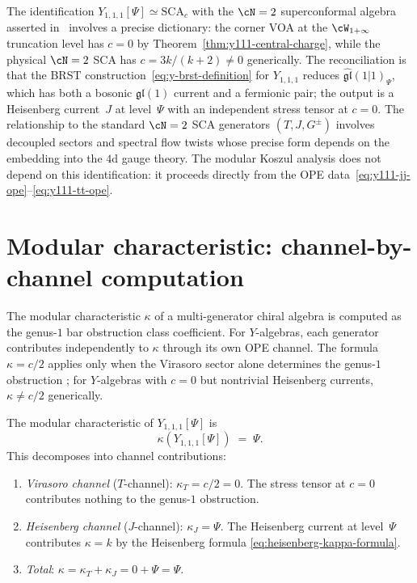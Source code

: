 \begin{remark}[Relationship to the $\cN = 2$ superconformal
algebra]%
\label{rem:y111-n2-relationship}
The identification $Y_{1,1,1}[\Psi] \simeq \mathrm{SCA}_{c}$
with the $\cN = 2$ superconformal algebra
asserted in~\cite{gaiotto-rapchak} involves a precise dictionary:
the corner VOA at the $\cW_{1+\infty}$ truncation level has
$c = 0$ by Theorem~\ref{thm:y111-central-charge}, while the
physical $\cN = 2$ SCA has $c = 3k/(k{+}2) \neq 0$ generically.
The reconciliation is that the BRST
construction~\eqref{eq:y-brst-definition} for $Y_{1,1,1}$
reduces $\widehat{\mathfrak{gl}}(1|1)_\Psi$, which has both
a bosonic $\mathfrak{gl}(1)$ current and a fermionic pair;
the output is a Heisenberg current~$J$ at level~$\Psi$ with
an independent stress tensor at $c = 0$. The relationship
to the standard $\cN = 2$ SCA generators $(T, J, G^\pm)$
involves decoupled sectors and spectral flow twists whose
precise form depends on the embedding into the $4$d gauge theory.
The modular Koszul analysis does not depend on this
identification: it proceeds directly from the OPE
data~\eqref{eq:y111-jj-ope}--\eqref{eq:y111-tt-ope}.
\end{remark}


\section{Modular characteristic: channel-by-channel computation}%
\label{sec:y-kappa}

The modular characteristic $\kappa$ of a multi-generator
chiral algebra is computed as the genus-$1$ bar obstruction
class coefficient. For $Y$-algebras, each generator
contributes independently to $\kappa$ through its own OPE
channel. The formula $\kappa = c/2$ applies only when the
Virasoro sector alone determines the genus-$1$ obstruction
; for $Y$-algebras with $c = 0$ but nontrivial
Heisenberg currents, $\kappa \neq c/2$ generically.

\begin{theorem}%
\label{thm:y111-kappa-channels}
The modular characteristic of $Y_{1,1,1}[\Psi]$ is
\begin{equation}\label{eq:y111-kappa}
\kappa(Y_{1,1,1}[\Psi]) \;=\; \Psi.
\end{equation}
This decomposes into channel contributions:
\begin{enumerate}[label=\textup{(\roman*)}]
\item \emph{Virasoro channel} ($T$-channel):
 $\kappa_T = c/2 = 0$. The stress tensor at $c = 0$
 contributes nothing to the genus-$1$ obstruction.
\item \emph{Heisenberg channel} ($J$-channel):
 $\kappa_J = \Psi$. The Heisenberg current at level~$\Psi$
 contributes $\kappa = k$ by the Heisenberg formula
 \eqref{eq:heisenberg-kappa-formula}.
\item \emph{Total}: $\kappa = \kappa_T + \kappa_J = 0 + \Psi
 = \Psi$.
\end{enumerate}
\end{theorem}

